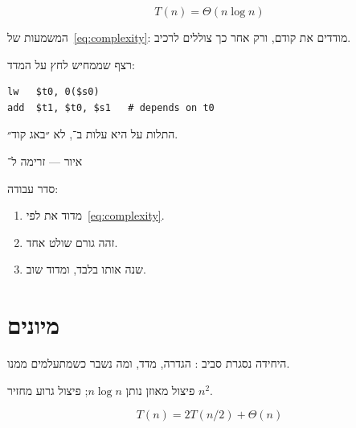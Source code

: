 \begin{equation}
\label{eq:complexity}
T(n)=\Theta(n\log n)
\end{equation}

המשמעות של~\eqref{eq:complexity}: מודדים את  קודם, ורק אחר כך צוללים לרכיב.

רצף שממחיש לחץ על המדד:
\begin{asmblock}
\begin{lstlisting}[style=asm]
lw   $t0, 0($s0)
add  $t1, $t0, $s1   # depends on t0
\end{lstlisting}
\end{asmblock}
התלות על  היא עלות ב־, לא ״באג קוד״.

\begin{tikzpic}
\end{tikzpic}
\begin{center}\small איור — זרימה ל־\end{center}

סדר עבודה:
\begin{enumerate}
\item[(\textbf{א})] מדוד את  לפי~\eqref{eq:complexity}.
\item[(\textbf{ב})] זהה גורם שולט אחד.
\item[(\textbf{ג})] שנה אותו בלבד, ומדוד שוב.
\end{enumerate}

\chapter{מיונים}
\label{ch:sort}

היחידה נסגרת סביב : הגדרה, מדד, ומה נשבר כשמתעלמים ממנו.

\begin{keybox}[frametitle={רעיון מפתח — מיונים}]
פיצול מאוזן נותן $n\log n$; פיצול גרוע מחזיר $n^2$.
\end{keybox}

\begin{equation}
\label{eq:sort}
T(n)=2T(n/2)+\Theta(n)
\end{equation}

